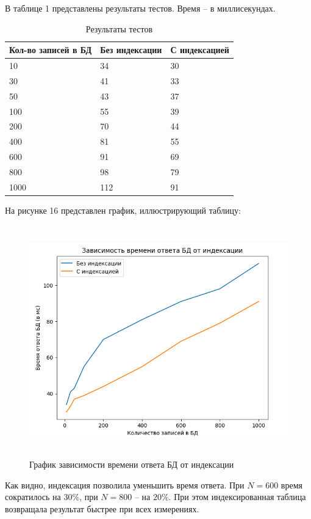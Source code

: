 В таблице 1 представлены результаты тестов. Время -- в миллисекундах.
\FloatBarrier
\begin{table}[h]
	\caption{Результаты тестов}
	\centering
	\begin{tabular}{ | l | l | l |}
		\hline
		Кол-во записей в БД & Без индексации & С индексацией \\ 
		\hline
		10 & 34 & 30 \\
		30 & 41 & 33 \\
		50 & 43 & 37 \\
		100 & 55 & 39 \\
		200 & 70 & 44 \\
		400 & 81 & 55 \\
		600 & 91 & 69 \\
		800 & 98 & 79 \\
		1000 & 112 & 91 \\
		\hline
	\end{tabular}
\end{table}
\FloatBarrier

На рисунке 16 представлен график, иллюстрирующий таблицу:
\FloatBarrier
\begin{figure}[h]	
	\begin{center}
		\includegraphics[height=10cm, width=\linewidth]{inc/graph.png}
	\end{center}
	\captionsetup{justification=centering, labelsep=defffis}
	\caption{График зависимости времени ответа БД от индексации}
\end{figure}
\FloatBarrier

Как видно, индексация позволила уменьшить время ответа. При $N=600$ время сократилось на $30\%$, при $N=800$ -- на $20\%$. При этом индексированная таблица возвращала результат быстрее при всех измерениях.